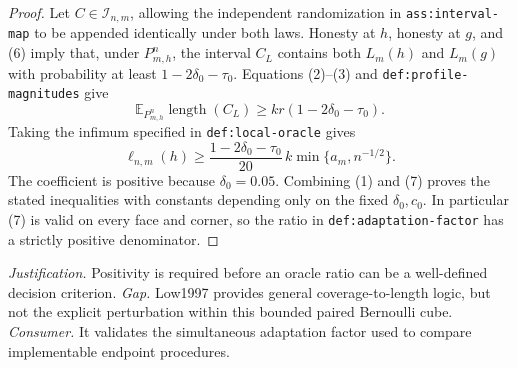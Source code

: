 \documentclass{article}
\begin{document}
\begin{proof}
Let \(C\in\mathcal I_{n,m}\), allowing the independent randomization in
\texttt{ass:interval-map} to be appended identically under both laws.
Honesty at \(h\), honesty at \(g\), and (6) imply that, under
\(P_{m,h}^n\), the interval \(C_L\) contains both \(L_m(h)\) and
\(L_m(g)\) with probability at least
\(1-2\delta_0-\tau_0\).  Equations (2)--(3) and
\texttt{def:profile-magnitudes} give
\[
 \mathbb E_{P_{m,h}^n}\operatorname{length}(C_L)
 \ge kr(1-2\delta_0-\tau_0).
\]
Taking the infimum specified in \texttt{def:local-oracle} gives
\[
 \ell_{n,m}(h)\ge
 \frac{1-2\delta_0-\tau_0}{20}\,k\min\{a_m,n^{-1/2}\}.                \tag{7}
\]
The coefficient is positive because \(\delta_0=0.05\).  Combining (1) and
(7) proves the stated inequalities with constants depending only on the
fixed \(\delta_0,c_0\).  In particular (7) is valid on every face and corner,
so the ratio in \texttt{def:adaptation-factor} has a strictly positive
denominator.
\end{proof}
\par\smallskip\noindent \textit{Justification.} Positivity is required before an oracle ratio can be a well-defined decision criterion. \textit{Gap.} Low1997 provides general coverage-to-length logic, but not the explicit perturbation within this bounded paired Bernoulli cube. \textit{Consumer.} It validates the simultaneous adaptation factor used to compare implementable endpoint procedures.
\end{document}
